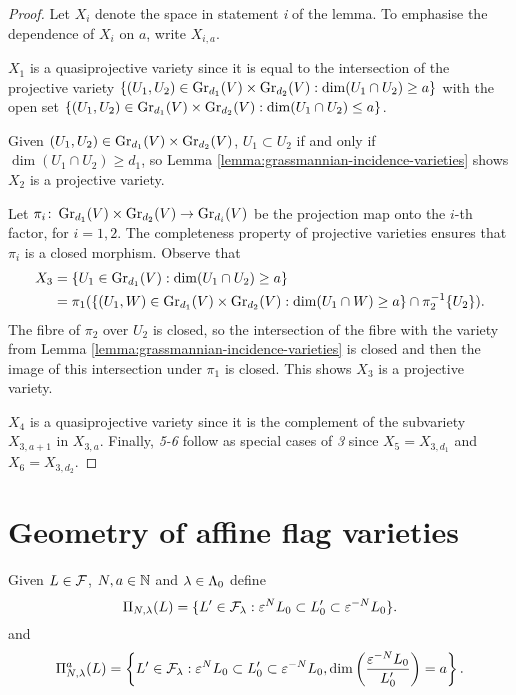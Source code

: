 \documentclass[a4paper, 11pt]{report}
\begin{document}
\begin{proof}
Let $X_i$ denote the space in statement \emph{i} of the lemma. To emphasise the dependence of $X_i$ on $a$, write $X_{i,a}$.

$X_1$ is a quasiprojective variety since it is equal to the intersection of the projective variety $\{(U_1,U_2)\in\GR[d_1]{V}\times\GR[d_2]{V}: \dim(U_1\cap U_2)\geq a\}$ with the open set $\{(U_1,U_2)\in\GR[d_1]{V}\times\GR[d_2]{V}: \dim(U_1\cap U_2)\le a\}$.

Given $(U_1,U_2)\in\GR[d_1]{V}\times\GR[d_2]{V}$, $U_1\subset U_2$ if and only if $\dim(U_1\cap U_2)\geq d_1$, so Lemma \ref{lemma:grassmannian-incidence-varieties} shows $X_2$ is a projective variety.

Let $\pi_i\colon\GR[d_1]{V}\times\GR[d_2]{V}\to\GR[d_i]{V}$ be the projection map onto the $i$-th factor, for $i=1,2$. The completeness property of projective varieties ensures that $\pi_i$ is a closed morphism. Observe that
\begin{align*}
X_3 
&= \{U_1\in\GR[d_1]{V}:\dim(U_1\cap U_2)\geq a\}\\
&= \pi_1(\{(U_1,W)\in\GR[d_1]{V}\times\GR[d_2]{V}: \dim(U_1\cap W)\geq a\}\cap\pi_2^{-1}\{U_2\}).
\end{align*}
The fibre of $\pi_2$ over $U_2$ is closed, so the intersection of the fibre with the variety from Lemma \ref{lemma:grassmannian-incidence-varieties} is closed and then the image of this intersection under $\pi_1$ is closed. This shows $X_3$ is a projective variety.

$X_4$ is a quasiprojective variety since it is the complement of the subvariety $X_{3,a+1}$ in $X_{3,a}$. Finally, \emph{5-6} follow as special cases of \emph{3} since $X_5 = X_{3,d_1}$ and $X_6 = X_{3,d_2}$.
\end{proof}


\section{Geometry of affine flag varieties}

Given $L\in\flags$, $N,a\in\naturals$ and $\lambda\in\compositions$ define
\begin{equation*}
\Pi_{N,\lambda}(L) = \{L'\in\flags_\lambda: \epsilon^N L_0\subset L_0'\subset \epsilon^{-N}L_0\}.
\end{equation*}
and
\begin{equation*}
\Pi_{N,\lambda}^a(L) = \left\{L'\in\flags_\lambda: \epsilon^N L_0\subset L_0'\subset \epsilon^{-N}L_0, \dim\left(\frac{\epsilon^{-N}L_0}{L_0'}\right) = a\right\}.
\end{equation*}
\end{document}
